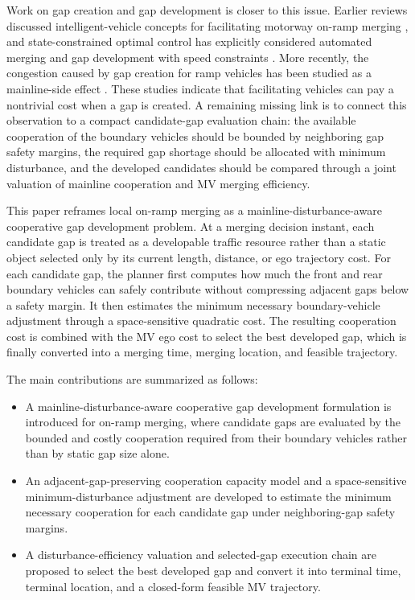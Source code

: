 \documentclass[conference]{IEEEtran}
\begin{document}
Work on gap creation and gap development is closer to this issue. Earlier
reviews discussed intelligent-vehicle concepts for facilitating motorway
on-ramp merging \cite{scarinci2014control}, and state-constrained optimal
control has explicitly considered automated merging and gap development with
speed constraints \cite{zhou2018automated}. More recently, the congestion caused
by gap creation for ramp vehicles has been studied as a mainline-side effect
\cite{zhou2024congestion}. These studies indicate that facilitating vehicles can
pay a nontrivial cost when a gap is created. A remaining missing link is to
connect this observation to a compact candidate-gap evaluation chain: the
available cooperation of the boundary vehicles should be bounded by neighboring
gap safety margins, the required gap shortage should be allocated with minimum
disturbance, and the developed candidates should be compared through a joint
valuation of mainline cooperation and MV merging efficiency.

This paper reframes local on-ramp merging as a
mainline-disturbance-aware cooperative gap development problem. At a merging
decision instant, each candidate gap is treated as a developable traffic
resource rather than a static object selected only by its current length,
distance, or ego trajectory cost. For each candidate gap, the planner first
computes how much the front and rear boundary vehicles can safely contribute
without compressing adjacent gaps below a safety margin. It then estimates the
minimum necessary boundary-vehicle adjustment through a space-sensitive
quadratic cost. The resulting cooperation cost is combined with the MV ego cost
to select the best developed gap, which is finally converted into a merging
time, merging location, and feasible trajectory.

The main contributions are summarized as follows:
\begin{itemize}
    \item A mainline-disturbance-aware cooperative gap development formulation
    is introduced for on-ramp merging, where candidate gaps are evaluated by the
    bounded and costly cooperation required from their boundary vehicles rather
    than by static gap size alone.
    \item An adjacent-gap-preserving cooperation capacity model and a
    space-sensitive minimum-disturbance adjustment are developed to estimate the
    minimum necessary cooperation for each candidate gap under neighboring-gap
    safety margins.
    \item A disturbance-efficiency valuation and selected-gap execution chain
    are proposed to select the best developed gap and convert it into terminal
    time, terminal location, and a closed-form feasible MV trajectory.
\end{itemize}
\end{document}
